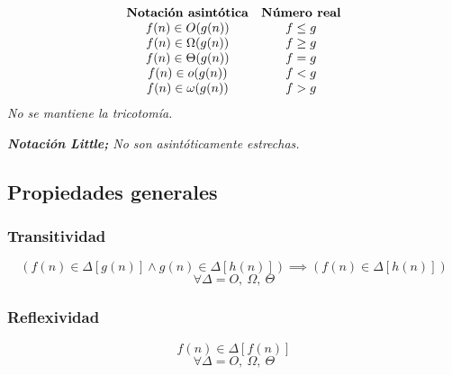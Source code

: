 \begin{theorem}
	$$\begin{array}{cc}
			\text{\textbf{Notación asintótica}} & \text{\textbf{Número real}} \\
			f(n) \in O(g(n))                    & f\le g                      \\
			f(n) \in \Omega(g(n))               & f\ge g                      \\
			f(n) \in \Theta(g(n))               & f= g                        \\
			f(n) \in o(g(n))                    & f< g                        \\
			f(n) \in \omega(g(n))               & f> g                        \\
		\end{array}$$
	\textit{No se mantiene la tricotomía.}
\end{theorem}

\begin{remark}
	\textit{\textbf{Notación Little;} No son asintóticamente estrechas.}
\end{remark}


\subsection{Propiedades generales}
\subsubsection{Transitividad}
$$
	(f(n)\in\Delta[g(n)] \land g(n)\in\Delta[h(n)])
	\implies
	(f(n)\in\Delta[h(n)]) $$ $$
	\forall\Delta=O,~\Omega,~\Theta
$$
\subsubsection{Reflexividad}
$$
	f(n)\in\Delta[f(n)] $$ $$
	\forall\Delta=O,~\Omega,~\Theta
$$

